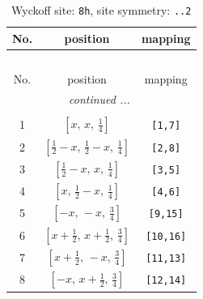 \documentclass[fleqn,8pt]{jsarticle}
\begin{document}
\begin{longtable}{ccc}
\caption{Wyckoff site: {\tt 8h}, site symmetry: {\tt ..2}}
 \\
 \hline \hline
No. & position & mapping \\ \hline \endfirsthead

\multicolumn{2}{l}{\tablename\ \thetable{}} \\
 \hline \hline
No. & position & mapping \\ \hline \endhead

 \hline \hline
\multicolumn{2}{r}{\footnotesize\it continued ...} \\ \endfoot

 \hline \hline
\multicolumn{2}{r}{} \\ \endlastfoot

1 & $\left[ x,\, x,\, \frac{1}{4} \right]$ & {\tt [1,7]} \\ \hline
2 & $\left[ \frac{1}{2} - x,\, \frac{1}{2} - x,\, \frac{1}{4} \right]$ & {\tt [2,8]} \\ \hline
3 & $\left[ \frac{1}{2} - x,\, x,\, \frac{1}{4} \right]$ & {\tt [3,5]} \\ \hline
4 & $\left[ x,\, \frac{1}{2} - x,\, \frac{1}{4} \right]$ & {\tt [4,6]} \\ \hline
5 & $\left[ - x,\, - x,\, \frac{3}{4} \right]$ & {\tt [9,15]} \\ \hline
6 & $\left[ x + \frac{1}{2},\, x + \frac{1}{2},\, \frac{3}{4} \right]$ & {\tt [10,16]} \\ \hline
7 & $\left[ x + \frac{1}{2},\, - x,\, \frac{3}{4} \right]$ & {\tt [11,13]} \\ \hline
8 & $\left[ - x,\, x + \frac{1}{2},\, \frac{3}{4} \right]$ & {\tt [12,14]} \\
\end{longtable}
\renewcommand{\arraystretch}{1.2}
\end{document}
